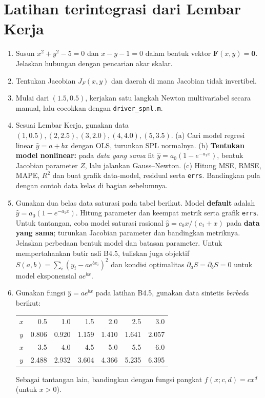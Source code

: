\section{Latihan terintegrasi dari Lembar Kerja}
\begin{enumerate}
\item[\textbf{B4.1 (L1)}] Susun $x^2+y^2-5=0$ dan $x-y-1=0$ dalam bentuk vektor $\mathbf{F}(x,y)=\mathbf{0}$. Jelaskan hubungan dengan pencarian akar skalar.
\item[\textbf{B4.2 (L2)}] Tentukan Jacobian $J_F(x,y)$ dan daerah di mana Jacobian tidak invertibel.
\item[\textbf{B4.3 (L3)}] Mulai dari $(1.5,0.5)$, kerjakan satu langkah Newton multivariabel secara manual, lalu cocokkan dengan \texttt{driver\_spnl.m}.
\item[\textbf{B4.4 (L4)}] Sesuai Lembar Kerja, gunakan data $ (1,0.5),(2,2.5),(3,2.0),(4,4.0),(5,3.5)$. (a) Cari model regresi linear $\widehat y=a+bx$ dengan OLS, turunkan SPL normalnya. (b) \textbf{Tentukan model nonlinear:} pada \emph{data yang sama} fit $\widehat y=a_0(1-e^{-a_1x})$, bentuk Jacobian parameter $Z$, lalu jalankan Gauss--Newton. (c) Hitung MSE, RMSE, MAPE, $R^2$ dan buat grafik data-model, residual serta \texttt{errs}. Bandingkan pula dengan contoh data kelas di bagian sebelumnya.
\item[\textbf{B4.5 (L5)}] Gunakan dua belas data saturasi pada tabel berikut. Model \textbf{default} adalah $\widehat y=a_0(1-e^{-a_1x})$. Hitung parameter dan keempat metrik serta grafik \texttt{errs}. Untuk tantangan, coba model saturasi rasional $\widehat y=c_0x/(c_1+x)$ pada \textbf{data yang sama}; turunkan Jacobian parameter dan bandingkan metriknya. Jelaskan perbedaan bentuk model dan batasan parameter. Untuk mempertahankan butir asli B4.5, tuliskan juga objektif $S(a,b)=\sum_i(y_i-ae^{bx_i})^2$ dan kondisi optimalitas $\partial_a S=\partial_b S=0$ untuk model eksponensial $ae^{bx}$.

\item[\textbf{B4.6 (L6)}]  Gunakan fungsi $\widehat y=ae^{bx}$ pada latihan B4.5, gunakan data sintetis \emph{berbeda} berikut:
\begin{center}\small
\begin{tabular}{c|rrrrrr}\hline
$x$&0.5&1.0&1.5&2.0&2.5&3.0\\
$y$&0.806&0.920&1.159&1.410&1.641&2.057\\\hline
$x$&3.5&4.0&4.5&5.0&5.5&6.0\\
$y$&2.488&2.932&3.604&4.366&5.235&6.395\\\hline
\end{tabular}
\end{center}
Sebagai tantangan lain, bandingkan dengan fungsi pangkat $f(x;c,d)=cx^d$ (untuk $x>0$).


\end{enumerate}

